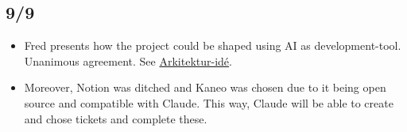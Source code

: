 \documentclass[a4paper,11pt]{article}
\begin{document}
\subsection*{9/9}
\begin{itemize}
    \item Fred presents how the project could be shaped using AI as development-tool. Unanimous agreement. See \href{run:./Arkitektur-ide.pdf}{Arkitektur-idé}.
    \item Moreover, Notion was ditched and Kaneo was chosen due to it being open source and compatible with Claude. This way, Claude will be able to create and chose tickets and complete these. 
\end{itemize}

\printbibliography
\end{document}

